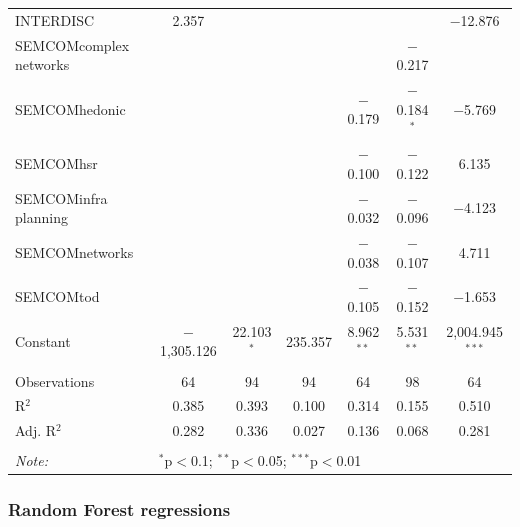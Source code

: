 \documentclass[10pt]{article}
\begin{document}
\begin{table}
\begin{tabular}{lcccccc}
  INTERDISC & 2.357 &  &  &  &  & $-$12.876 \\ 
  SEMCOMcomplex networks &  &  &  &  & $-$0.217 &  \\ 
  SEMCOMhedonic &  &  &  & $-$0.179 & $-$0.184$^{*}$ & $-$5.769 \\ 
  SEMCOMhsr &  &  &  & $-$0.100 & $-$0.122 & 6.135 \\ 
  SEMCOMinfra planning &  &  &  & $-$0.032 & $-$0.096 & $-$4.123 \\ 
  SEMCOMnetworks &  &  &  & $-$0.038 & $-$0.107 & 4.711 \\ 
  SEMCOMtod &  &  &  & $-$0.105 & $-$0.152 & $-$1.653 \\ 
  Constant & $-$1,305.126 & 22.103$^{*}$ & 235.357 & 8.962$^{**}$ & 5.531$^{**}$ & 2,004.945$^{***}$ \\ 
 \hline \\[-1.8ex] 
Observations & 64 & 94 & 94 & 64 & 98 & 64 \\ 
R$^{2}$ & 0.385 & 0.393 & 0.100 & 0.314 & 0.155 & 0.510 \\ 
Adj. R$^{2}$ & 0.282 & 0.336 & 0.027 & 0.136 & 0.068 & 0.281 \\ 
\hline 
\hline \\[-1.8ex] 
\textit{Note:}  & \multicolumn{6}{l}{$^{*}$p$<$0.1; $^{**}$p$<$0.05; $^{***}$p$<$0.01} \\ 
\end{tabular}
\end{table} 

\subsubsection{Random Forest regressions}
\end{document}
